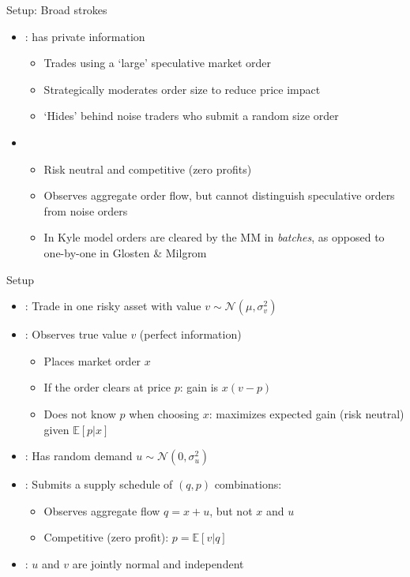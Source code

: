 \documentclass[english,10pt
,aspectratio=169
]{beamer}
\begin{document}
\begin{frame}{Setup: Broad strokes}
	\begin{itemize}
		\item {}: has private information
		\begin{itemize}
			\item Trades using a `large' speculative market order
			\item Strategically moderates order size to reduce price impact
			\item `Hides' behind noise traders who submit a random size order
		\end{itemize}
		\item {}
		\begin{itemize}
			\item Risk neutral and competitive (zero profits)
			\item Observes aggregate order flow, but cannot distinguish speculative orders from noise orders
			\item In Kyle model orders are cleared by the MM in \textit{batches}, as opposed to one-by-one in Glosten \& Milgrom
		\end{itemize}
	\end{itemize}
\end{frame}


\begin{frame}{Setup}
\begin{itemize}
	\item {}: Trade in one risky asset with value  $v \sim \mathcal{N}(\mu, \sigma^2_v)$
	\item {}: Observes true value $v$ (perfect information)
	\begin{itemize}
		\item Places market order $x$
		\item If the order clears at price $p$: gain is $x(v-p)$
		\item Does \alert{not know} $p$ when choosing $x$: maximizes expected gain (risk neutral) given $\mathbb{E}[p|x]$
	\end{itemize}
	\item {}: Has random demand $u \sim \mathcal{N}(0, \sigma^2_u)$
	\item {}: Submits a supply schedule of $(q,p)$ combinations:
	\begin{itemize}
		\item Observes aggregate flow $q=x+u$, but not $x$ and $u$
		\item Competitive (zero profit): $p = \mathbb{E}[v|q]$
	\end{itemize}
	\item {}: $u$ and $v$ are jointly normal and independent
\end{itemize}
\end{frame}
\end{document}
